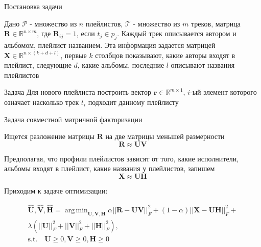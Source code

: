\documentclass{beamer}
\DeclareMathOperator*{\argmin}{arg\,min}
\begin{document}
\begin{frame}{Постановка задачи}
\begin{block}{Дано}
$\mathcal{P}$ - множество из ${n}$ плейлистов, $\mathcal{T}$ - множество из ${m}$ треков, матрица $\mathbf{R} \in \mathbb{R}^{n \times m}$, где $\mathbf{R}_{ij} = 1$, 
если $t_j \in {p}_j$. Каждый трек описывается автором и альбомом, плейлист названием. Эта информация задается матрицей $\mathbf{X} \in \mathbb{R}^{n \times (k + d + l)}$, первые $k$ столбцов показывают, какие авторы входят в плейлист, следующие $d$, какие альбомы, последние $l$ описывают названия плейлистов
\end{block}
\begin{block}{Задача}
Для нового плейлиста построить вектор $\mathbf{r} \in \mathbb{R}^{m \times 1}$, $i$-ый элемент которого означает насколько трек $t_i$ подходит данному плейлисту
\end{block}
\end{frame}
\begin{frame}{Задача совместной матричной факторизации}

Ищется разложение матрицы $\mathbf{R}$ на две матрицы меньшей размерности \[ \mathbf{R} \approx \mathbf{UV}\]

Предполагая, что профили плейлистов зависят от того, какие исполнители, альбомы входят в плейлист, 
какие названия у плейлистов, запишем \[\mathbf{X} \approx \mathbf{UH}\]

Приходим к задаче оптимизации:

\begin{equation}
\begin{gathered}
\hat{\mathbf{U}}, \hat{\mathbf{V}}, \hat{\mathbf{H}} = \argmin_{\mathbf{U, V, H}}\alpha||\mathbf{R} - \mathbf{UV}||_F^2 +(1 - \alpha) ||\mathbf{X} - \mathbf{UH}||_F^2 + \\
 \lambda(||\mathbf{U}||_F^2 + ||\mathbf{V}||_F^2 + ||\mathbf{H}||_F^2), \\
 \text{s.t.}  \quad \mathbf{U} \geq 0,  \mathbf{V} \geq 0,   \mathbf{H} \geq 0
\end{gathered}
\end{equation}

\end{frame}
\end{document}
